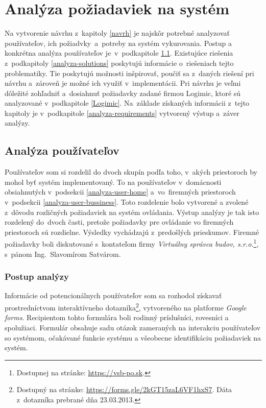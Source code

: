 \chapter{Analýza požiadaviek na systém}\label{anal}
Na vytvorenie návrhu z~kapitoly \ref{navrh} je najskôr potrebné analyzovať používateľov, ich požiadvky~a~potreby na systém vykurovania. 
Postup a konkrétna analýza používateľov je~v~podkapitole \ref{analyza-user}. 
Existujúce riešenia z~podkapitoly \ref{analyza-solutions} poskytujú informácie o~riešeniach tejto problematiky. 
Tie poskytujú možnosti inšpirovať, poučiť sa z~daných riešení pri návrhu a~zároveň je možné ich využiť v~implementácii. 
Pri návrhu je veľmi dôležité zohľadniť a~dosiahnuť požiadavky zadané firmou Logimic, ktoré sú analyzované v~podkapitole \ref{Logimic}. 
Na~základe získaných informácii z~tejto kapitoly je v~podkapitole \ref{analyza-requirements} vytvorený výstup a~záver analýzy.

\section{Analýza používateľov}\label{analyza-user}
Používateľov som si rozdelil do dvoch skupín podľa toho, v~akých priestoroch by mohol byť systém implementovaný. 
To na používateľov v~domácnosti obsiahnutých v~podsekcii \ref{analyza-user-home} a~vo~firemných priestoroch v~podsekcii \ref{analyza-user-bussiness}. 
Toto rozdelenie bolo vytvorené a zvolené z~dôvodu rozličných požiadaviek na systém ovládania. 
Výstup analýzy je tak isto rozdelený do~dvoch časti, pretože požiadavky pre ovládanie vo firemných priestoroch sú rozdielne. Výsledky vychádzajú z~predošlých prieskumov. 
Firemné požiadavky boli diskutované s~kontateľom firmy \emph{Virtuálny správca budov, s.r.o.}\footnote{Dostupnej na stránke: \url{https://vsb-po.sk}.}, s~pánom Ing.~Slavomírom Satvárom.

\subsection*{Postup analýzy}
Informácie od potencionálnych používateľov som sa rozhodol získavať prostredníctvom interaktívneho dotazníka\footnote{Dostupný na stránke: \url{https://forms.gle/2kGT15zaL6VF1hxS7}. 
Dáta z~dotazníka prebrané dňa 23.03.2013.}, vytvoreného na platforme \emph{Google forms}. 
Recipientom tohto formulára boli rodinný príslušníci, rovesníci a spolužiaci. 
Formulár obsahuje sadu otázok zameraných na interakciu používateľov so systémom, očakávané funkcie systému a všeobecne identifikáciu požiadaviek na systém.

